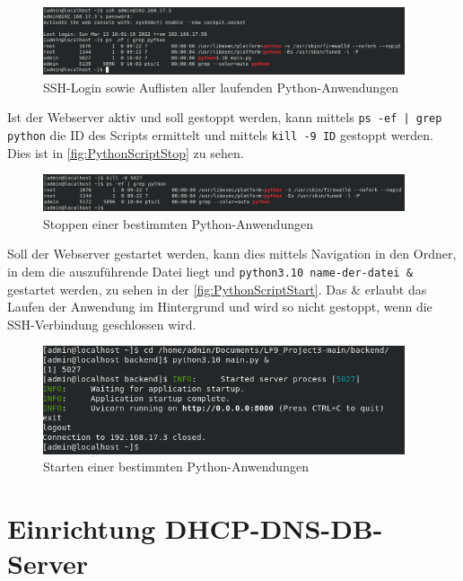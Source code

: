 \documentclass[a4paper,
    11pt,
    headings=small,
    ngerman,
    listof=totoc,
    numbers=noenddot]{scrreprt}[2021/11/13]
\begin{document}
\begin{figure}[htbp]
  \centering
  \includegraphics[width=0.95\textwidth]{data/py-script-running.png}
  \caption{SSH-Login sowie Auflisten aller laufenden Python-Anwendungen}
  \label{fig:PythonScriptRunning}
\end{figure}

Ist der Webserver aktiv und soll gestoppt werden, kann mittels \texttt{ps -ef | grep python} die ID des Scripts ermittelt und mittels \texttt{kill -9 ID} gestoppt werden. Dies ist in \vref{fig:PythonScriptStop} zu sehen.

\begin{figure}[htbp]
  \centering
  \includegraphics[width=0.95\textwidth]{data/py-script-admin-stop.png}
  \caption{Stoppen einer bestimmten Python-Anwendungen}
  \label{fig:PythonScriptStop}
\end{figure}

Soll der Webserver gestartet werden, kann dies mittels Navigation in den Ordner, in dem die auszuführende Datei liegt und \texttt{python3.10 name-der-datei \&} gestartet werden, zu sehen in der \vref{fig:PythonScriptStart}. Das \& erlaubt das Laufen der Anwendung im Hintergrund und wird so nicht gestoppt, wenn die SSH-Verbindung geschlossen wird.

\begin{figure}[htbp]
  \centering
  \includegraphics[width=0.95\textwidth]{data/py-script-admin-start.png}
  \caption{Starten einer bestimmten Python-Anwendungen}
  \label{fig:PythonScriptStart}
\end{figure}



\section{Einrichtung DHCP-DNS-DB-Server}
\end{document}
